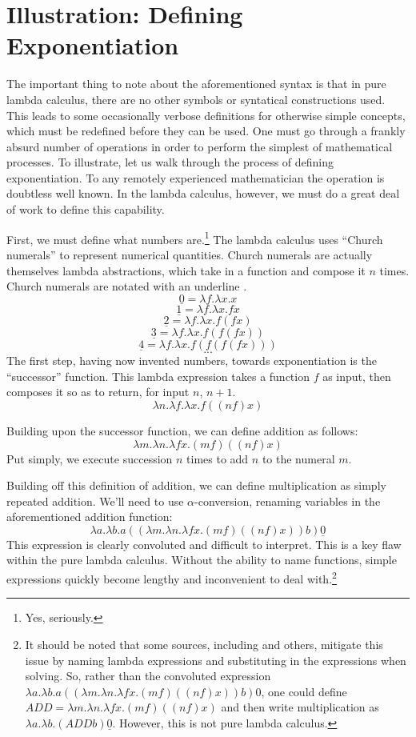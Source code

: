 \documentclass[twocolumn,titlepage,12pt]{article}
\begin{document}
\section{Illustration: Defining Exponentiation}
The important thing to note about the aforementioned syntax is that in pure lambda calculus, there are no other symbols or syntatical constructions used. This leads to some occasionally verbose definitions for otherwise simple concepts, which must be redefined before they can be used. One must go through a frankly absurd number of operations in order to perform the simplest of mathematical processes. To illustrate, let us walk through the process of defining exponentiation. To any remotely experienced mathematician the operation is doubtless well known. In the lambda calculus, however, we must do a great deal of work to define this capability.

First, we must define what numbers are.\footnote{Yes, seriously.} The lambda calculus uses ``Church numerals'' to represent numerical quantities. Church numerals are actually themselves lambda abstractions, which take in a function and compose it $n$ times. Church numerals are notated with an underline \cite{cornelllc}.
$$\underline{0}=\lambda f.\lambda x.x$$
$$\underline{1}=\lambda f.\lambda x.fx$$
$$\underline{2}=\lambda f.\lambda x.f(fx)$$
$$\underline{3}=\lambda f.\lambda x.f(f(fx))$$
$$\underline{4}=\lambda f.\lambda x.f(f(f(fx)))$$
$$...$$
The first step, having now invented numbers, towards exponentiation is the ``successor'' function. This lambda expression takes a function $f$ as input, then composes it so as to return, for input $n$, $n+1$.
$$\lambda n.\lambda f.\lambda x.f((n f) x)$$

Building upon the successor function, we can define addition as follows:
$$\lambda m.\lambda n.\lambda fx.(m f) ((n f) x)$$
Put simply, we execute succession $n$ times to add $n$ to the numeral $m$.

Building off this definition of addition, we can define multiplication as simply repeated addition. We'll need to use $\alpha$-conversion, renaming variables in the aforementioned addition function:
$$\lambda a.\lambda b.a ((\lambda m.\lambda n.\lambda fx.(m f) ((n f) x)) b) \underline{0}$$
This expression is clearly convoluted and difficult to interpret. This is a key flaw within the pure lambda calculus. Without the ability to name functions, simple expressions quickly become lengthy and inconvenient to deal with.\footnote{It should be noted that some sources, including \cite{cornellc}\cite{rojastutorial} and others, mitigate this issue by naming lambda expressions and substituting in the expressions when solving. So, rather than the convoluted expression $\lambda a.\lambda b.a ((\lambda m.\lambda n.\lambda fx.(m f) ((n f) x)) b) 0$, one could define $ADD=\lambda m.\lambda n.\lambda fx.(m f) ((n f) x)$ and then write multiplication as $\lambda a.\lambda b.(ADD b) \underline{0}$. However, this is not pure lambda calculus.}
\end{document}
